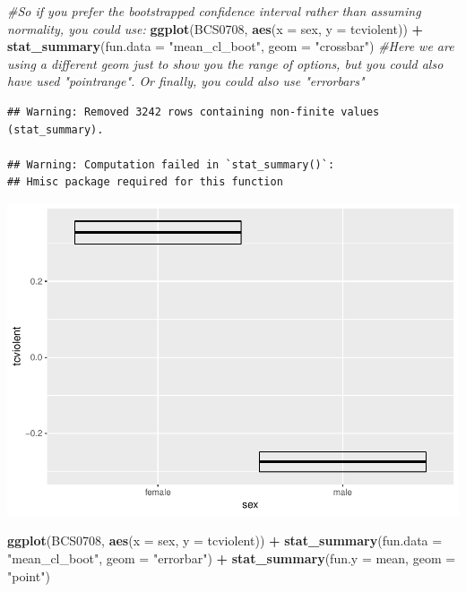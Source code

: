 \documentclass[]{book}
\newenvironment{Shaded}{\begin{snugshade}}{\end{snugshade}}
\newcommand{\CommentTok}[1]{\textcolor[rgb]{0.56,0.35,0.01}{\textit{#1}}}
\newcommand{\DataTypeTok}[1]{\textcolor[rgb]{0.13,0.29,0.53}{#1}}
\newcommand{\KeywordTok}[1]{\textcolor[rgb]{0.13,0.29,0.53}{\textbf{#1}}}
\newcommand{\NormalTok}[1]{#1}
\newcommand{\OperatorTok}[1]{\textcolor[rgb]{0.81,0.36,0.00}{\textbf{#1}}}
\newcommand{\StringTok}[1]{\textcolor[rgb]{0.31,0.60,0.02}{#1}}
\theoremstyle{definition}
\theoremstyle{definition}
\theoremstyle{definition}
\theoremstyle{remark}
\begin{document}
\begin{Shaded}
\begin{Highlighting}[]
\CommentTok{#So if you prefer the bootstrapped confidence interval rather than assuming normality, you could use:}
\KeywordTok{ggplot}\NormalTok{(BCS0708, }\KeywordTok{aes}\NormalTok{(}\DataTypeTok{x =}\NormalTok{ sex, }\DataTypeTok{y =}\NormalTok{ tcviolent)) }\OperatorTok{+}
\StringTok{       }\KeywordTok{stat_summary}\NormalTok{(}\DataTypeTok{fun.data =} \StringTok{"mean_cl_boot"}\NormalTok{, }\DataTypeTok{geom =} \StringTok{"crossbar"}\NormalTok{) }\CommentTok{#Here we are using a different geom just to show you the range of options, but you could also have used "pointrange". Or finally, you could also use "errorbars"}
\end{Highlighting}
\end{Shaded}

\begin{verbatim}
## Warning: Removed 3242 rows containing non-finite values (stat_summary).

## Warning: Computation failed in `stat_summary()`:
## Hmisc package required for this function
\end{verbatim}

\includegraphics{05-inference_files/figure-latex/unnamed-chunk-43-2.pdf}

\begin{Shaded}
\begin{Highlighting}[]
\KeywordTok{ggplot}\NormalTok{(BCS0708, }\KeywordTok{aes}\NormalTok{(}\DataTypeTok{x =}\NormalTok{ sex, }\DataTypeTok{y =}\NormalTok{ tcviolent)) }\OperatorTok{+}
\StringTok{       }\KeywordTok{stat_summary}\NormalTok{(}\DataTypeTok{fun.data =} \StringTok{"mean_cl_boot"}\NormalTok{, }\DataTypeTok{geom =} \StringTok{"errorbar"}\NormalTok{) }\OperatorTok{+}
\StringTok{        }\KeywordTok{stat_summary}\NormalTok{(}\DataTypeTok{fun.y =}\NormalTok{ mean, }\DataTypeTok{geom =} \StringTok{"point"}\NormalTok{)}
\end{Highlighting}
\end{Shaded}
\end{document}
